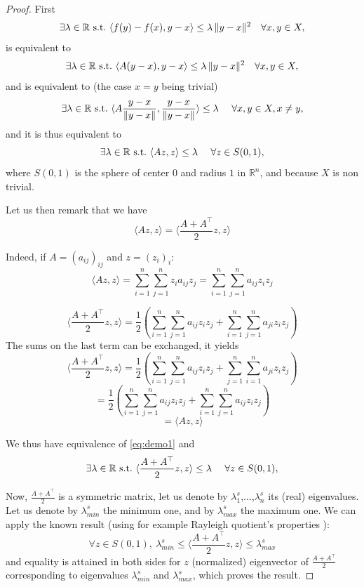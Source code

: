 \begin{proof}
First
\[
\exists \lambda \in \mathbb{R} \ \text{s.t.} \ \langle f(y)-f(x), y-x \rangle \leq \lambda\, \|y-x\|^2\quad
\forall x,y\in X,
\]
is equivalent to
\[
\exists \lambda \in \mathbb{R} \ \text{s.t.} \ \langle A(y-x), y-x \rangle \leq \lambda\, \|y-x\|^2\quad
\forall x,y\in X,
\]
and is equivalent to (the case $x = y$ being trivial)
\begin{equation}
\exists \lambda \in \R \ \text{s.t.} \ \langle A \frac{y-x}{\| y-x \|}, \frac{y-x}{\| y - x \|} \rangle \leq \lambda\ \quad
\forall x,y\in X, x \neq y, 
\label{eq:demo0}
\end{equation}
and it is thus equivalent to 
\begin{equation}
\exists \lambda \in \mathbb{R} \ \text{s.t.} \ \langle {Az}, {z} \rangle \leq \lambda\ \quad
\forall z \in S(0,1),
\label{eq:demo1}
\end{equation}
where $S(0,1)$ is the sphere of center $0$ and radius $1$ in $\mathbb{R}^n$, and because $X$ is non trivial.


Let us then remark that we have
\begin{equation}
\langle {Az}, {z} \rangle = \langle { \frac{A + A^\top}{2} z}, {z} \rangle
\label{eq:rem}
\end{equation}

Indeed, if $A = (a_{ij})_{ij}$ and $z = (z_i)_i$:
$$
\langle {Az}, {z} \rangle = \sum_{i=1}^n \sum_{j=1}^n z_i a_{ij} z_j  = \sum_{i=1}^n \sum_{j=1}^n a_{ij} z_i z_j
$$

$$
\langle {\frac{A+A^\top}{2}z}, {z} \rangle = \frac{1}{2} \left(\sum_{i=1}^n \sum_{j=1}^n a_{ij} z_i z_j +\sum_{i=1}^n \sum_{j=1}^n  a_{ji} z_i z_j \right) 
$$
The sums on the last term can be exchanged, it yields
$$
\langle {\frac{A+A^\top}{2}z}, {z} \rangle = \frac{1}{2} \left(\sum_{i=1}^n \sum_{j=1}^n a_{ij} z_i z_j +\sum_{j=1}^n \sum_{i=1}^n  a_{ji} z_i z_j \right) 
$$
$$
= \frac{1}{2} \left(\sum_{i=1}^n \sum_{j=1}^n a_{ij} z_i z_j +\sum_{i=1}^n \sum_{j=1}^n  a_{ij} z_i z_j \right) 
$$
$$
= \langle {A z}, {z} \rangle
$$

We thus have equivalence of \eqref{eq:demo1} and 
\begin{equation}
\exists \lambda\in \R \ \text{s.t.} \ \langle {\frac{A + A^\top}{2}z}, {z} \rangle \leq \lambda\ \quad
\forall z \in S(0,1),
\label{eq:demo2}
\end{equation}

Now, $\frac{A + A^\top}{2}$ is a symmetric matrix, let us denote by 
$\lambda_1^s$,$\dots$,$\lambda_n^s$ its (real) eigenvalues. Let us denote by $\lambda_{min}^s$
the minimum one, and by  $\lambda_{max}^s$ the maximum one. We can apply the known result 
(using for example Rayleigh quotient's properties \cite{???}):
$$ \forall z \in S(0,1),\ \lambda_{min}^s  \leq \langle {\frac{A + A^\top}{2}z}, {z} \rangle \leq \lambda_{max}^s  $$
and equality is attained in both sides for $z$ (normalized) eigenvector of $\frac{A + A^\top}{2}$ 
corresponding to eigenvalues $\lambda_{min}^s$ and $\lambda_{max}^s$, which proves the result.


\end{proof}
